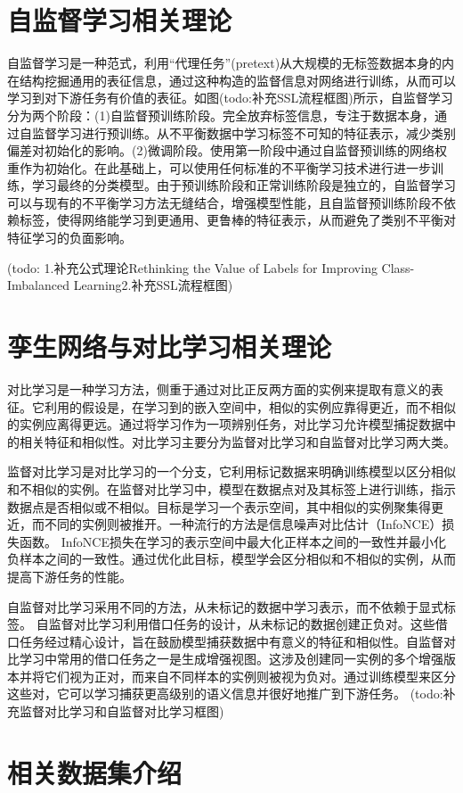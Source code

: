 \documentclass[master]{thesis-uestc}
\begin{document}
\section{自监督学习相关理论}
自监督学习是一种范式，利用“代理任务”(pretext)从大规模的无标签数据本身的内在结构挖掘通用的表征信息，通过这种构造的监督信息对网络进行训练，从而可以学习到对下游任务有价值的表征。如图(todo:补充SSL流程框图)所示，自监督学习分为两个阶段：(1)自监督预训练阶段。完全放弃标签信息，专注于数据本身，通过自监督学习进行预训练。从不平衡数据中学习标签不可知的特征表示，减少类别偏差对初始化的影响。(2)微调阶段。使用第一阶段中通过自监督预训练的网络权重作为初始化。在此基础上，可以使用任何标准的不平衡学习技术进行进一步训练，学习最终的分类模型。由于预训练阶段和正常训练阶段是独立的，自监督学习可以与现有的不平衡学习方法无缝结合，增强模型性能，且自监督预训练阶段不依赖标签，使得网络能学习到更通用、更鲁棒的特征表示，从而避免了类别不平衡对特征学习的负面影响。

(todo: 1.补充公式理论Rethinking the Value of Labels for Improving Class-Imbalanced Learning2.补充SSL流程框图)
\section{孪生网络与对比学习相关理论}
对比学习是一种学习方法，侧重于通过对比正反两方面的实例来提取有意义的表征。它利用的假设是，在学习到的嵌入空间中，相似的实例应靠得更近，而不相似的实例应离得更远。通过将学习作为一项辨别任务，对比学习允许模型捕捉数据中的相关特征和相似性。对比学习主要分为监督对比学习和自监督对比学习两大类。

监督对比学习是对比学习的一个分支，它利用标记数据来明确训练模型以区分相似和不相似的实例。在监督对比学习中，模型在数据点对及其标签上进行训练，指示数据点是否相似或不相似。目标是学习一个表示空间，其中相似的实例聚集得更近，而不同的实例则被推开。一种流行的方法是信息噪声对比估计（InfoNCE）损失函数。 InfoNCE损失在学习的表示空间中最大化正样本之间的一致性并最小化负样本之间的一致性。通过优化此目标，模型学会区分相似和不相似的实例，从而提高下游任务的性能。

自监督对比学习采用不同的方法，从未标记的数据中学习表示，而不依赖于显式标签。 自监督对比学习利用借口任务的设计，从未标记的数据创建正负对。这些借口任务经过精心设计，旨在鼓励模型捕获数据中有意义的特征和相似性。自监督对比学习中常用的借口任务之一是生成增强视图。这涉及创建同一实例的多个增强版本并将它们视为正对，而来自不同样本的实例则被视为负对。通过训练模型来区分这些对，它可以学习捕获更高级别的语义信息并很好地推广到下游任务。
(todo:补充监督对比学习和自监督对比学习框图)
\section{相关数据集介绍}
\end{document}
